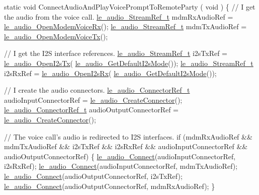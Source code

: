 \begin{DoxyCode}
\textcolor{keyword}{static} \textcolor{keywordtype}{void} ConnectAudioAndPlayVoicePromptToRemoteParty
(
    \textcolor{keywordtype}{void}
)
\{
    \textcolor{comment}{// I get the audio from the voice call.}
    \hyperlink{le__audio__interface_8h_a9a46ff5a5afa61f1bc76120ab9e4da0a}{le\_audio\_StreamRef\_t} mdmRxAudioRef = 
      \hyperlink{le__audio__interface_8h_ae3ed568ba4d2763ea77e17e77b20ff02}{le\_audio\_OpenModemVoiceRx}();
    \hyperlink{le__audio__interface_8h_a9a46ff5a5afa61f1bc76120ab9e4da0a}{le\_audio\_StreamRef\_t} mdmTxAudioRef = 
      \hyperlink{le__audio__interface_8h_ad745f008bb04873c817da7af3daf783d}{le\_audio\_OpenModemVoiceTx}();

    \textcolor{comment}{// I get the I2S interface references.}
    \hyperlink{le__audio__interface_8h_a9a46ff5a5afa61f1bc76120ab9e4da0a}{le\_audio\_StreamRef\_t} i2sTxRef = \hyperlink{le__audio__interface_8h_a2633c1368adf60e342d7cadbbfa6278b}{le\_audio\_OpenI2sTx}(
      \hyperlink{le__audio__interface_8h_a0b727e15c16fffe10cdd5d345b297194}{le\_audio\_GetDefaultI2sMode}());
    \hyperlink{le__audio__interface_8h_a9a46ff5a5afa61f1bc76120ab9e4da0a}{le\_audio\_StreamRef\_t} i2sRxRef = \hyperlink{le__audio__interface_8h_a9e7d0042c4f422554eb10d64535608e5}{le\_audio\_OpenI2sRx}(
      \hyperlink{le__audio__interface_8h_a0b727e15c16fffe10cdd5d345b297194}{le\_audio\_GetDefaultI2sMode}());

    \textcolor{comment}{// I create the audio connectors.}
    \hyperlink{le__audio__interface_8h_ab819480f4ce3f36e62b6a4e327668304}{le\_audio\_ConnectorRef\_t} audioInputConnectorRef = 
      \hyperlink{le__audio__interface_8h_a570aaf85086f00aca592acfbaaa237be}{le\_audio\_CreateConnector}();
    \hyperlink{le__audio__interface_8h_ab819480f4ce3f36e62b6a4e327668304}{le\_audio\_ConnectorRef\_t} audioOutputConnectorRef = 
      \hyperlink{le__audio__interface_8h_a570aaf85086f00aca592acfbaaa237be}{le\_audio\_CreateConnector}();

    \textcolor{comment}{// The voice call's audio is redirected to I2S interfaces.}
    \textcolor{keywordflow}{if} (mdmRxAudioRef && mdmTxAudioRef && i2sTxRef && i2sRxRef &&
        audioInputConnectorRef && audioOutputConnectorRef)
    \{
        \hyperlink{le__audio__interface_8h_a338df65b2fb1ae0140d86880adbcf0de}{le\_audio\_Connect}(audioInputConnectorRef, i2sRxRef);
        \hyperlink{le__audio__interface_8h_a338df65b2fb1ae0140d86880adbcf0de}{le\_audio\_Connect}(audioInputConnectorRef, mdmTxAudioRef);
        \hyperlink{le__audio__interface_8h_a338df65b2fb1ae0140d86880adbcf0de}{le\_audio\_Connect}(audioOutputConnectorRef, i2sTxRef);
        \hyperlink{le__audio__interface_8h_a338df65b2fb1ae0140d86880adbcf0de}{le\_audio\_Connect}(audioOutputConnectorRef, mdmRxAudioRef);
    \}


\end{DoxyCode}
